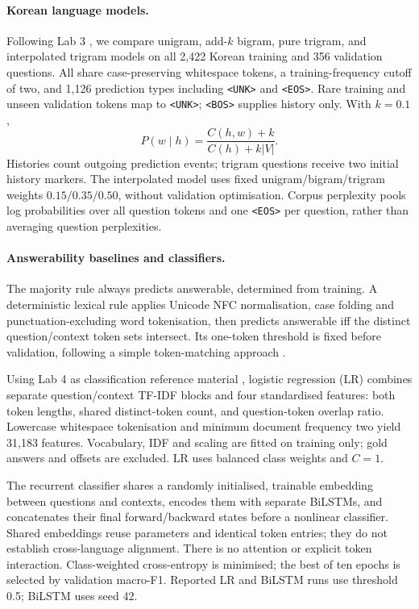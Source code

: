 \documentclass[11pt]{article}
\newcommand{\unk}{\texttt{<UNK>}}
\newcommand{\bos}{\texttt{<BOS>}}
\newcommand{\eos}{\texttt{<EOS>}}
\begin{document}
\paragraph{Korean language models.}
Following Lab 3 \citep{lab3}, we compare unigram, add-$k$ bigram, pure trigram, and interpolated trigram models on all 2,422 Korean training and 356 validation questions. All share case-preserving whitespace tokens, a training-frequency cutoff of two, and 1,126 prediction types including \unk{} and \eos{}. Rare training and unseen validation tokens map to \unk{}; \bos{} supplies history only. With $k=0.1$,
\begin{equation}
P(w\mid h)=\frac{C(h,w)+k}{C(h)+k|V|}.
\end{equation}
Histories count outgoing prediction events; trigram questions receive two initial history markers. The interpolated model uses fixed unigram/bigram/trigram weights $0.15/0.35/0.50$, without validation optimisation. Corpus perplexity pools log probabilities over all question tokens and one \eos{} per question, rather than averaging question perplexities.

\paragraph{Answerability baselines and classifiers.}
The majority rule always predicts answerable, determined from training. A deterministic lexical rule applies Unicode NFC normalisation, case folding and punctuation-excluding word tokenisation, then predicts answerable iff the distinct question/context token sets intersect. Its one-token threshold is fixed before validation, following a simple token-matching approach \citep{ir}.

Using Lab 4 as classification reference material \citep{lab4}, logistic regression (LR) combines separate question/context TF-IDF blocks and four standardised features: both token lengths, shared distinct-token count, and question-token overlap ratio. Lowercase whitespace tokenisation and minimum document frequency two yield 31,183 features. Vocabulary, IDF and scaling are fitted on training only; gold answers and offsets are excluded. LR uses balanced class weights and $C=1$.

The recurrent classifier shares a randomly initialised, trainable embedding between questions and contexts, encodes them with separate BiLSTMs, and concatenates their final forward/backward states before a nonlinear classifier. Shared embeddings reuse parameters and identical token entries; they do not establish cross-language alignment. There is no attention or explicit token interaction. Class-weighted cross-entropy is minimised; the best of ten epochs is selected by validation macro-F1. Reported LR and BiLSTM runs use threshold 0.5; BiLSTM uses seed 42.
\end{document}
